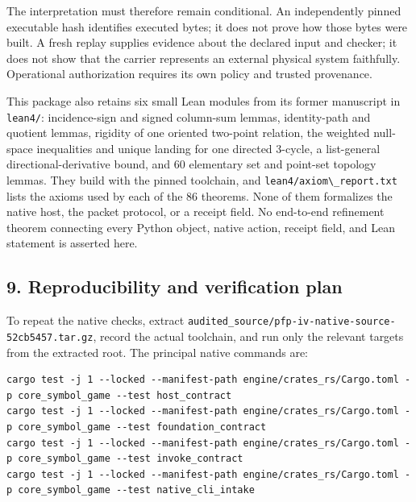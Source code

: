 \documentclass[
  11pt,
]{article}
\newcommand{\passthrough}[1]{#1}
\begin{document}
The interpretation must therefore remain conditional. An independently
pinned executable hash identifies executed bytes; it does not prove how
those bytes were built. A fresh replay supplies evidence about the
declared input and checker; it does not show that the carrier represents
an external physical system faithfully. Operational authorization
requires its own policy and trusted provenance.

This package also retains six small Lean modules from its former
manuscript in \passthrough{\lstinline!lean4/!}: incidence-sign and
signed column-sum lemmas, identity-path and quotient lemmas, rigidity of
one oriented two-point relation, the weighted null-space inequalities
and unique landing for one directed 3-cycle, a list-general
directional-derivative bound, and 60 elementary set and point-set
topology lemmas. They build with the pinned toolchain, and
\passthrough{\lstinline!lean4/axiom\_report.txt!} lists the axioms used
by each of the 86 theorems. None of them formalizes the native host, the
packet protocol, or a receipt field. No end-to-end refinement theorem
connecting every Python object, native action, receipt field, and Lean
statement is asserted here.

\subsection{9. Reproducibility and verification
plan}\label{reproducibility-and-verification-plan}

To repeat the native checks, extract
\nolinkurl{audited_source/pfp-iv-native-source-52cb5457.tar.gz}, record the
actual toolchain, and run only the relevant targets from the extracted
root. The principal native commands are:

\begin{lstlisting}
cargo test -j 1 --locked --manifest-path engine/crates_rs/Cargo.toml -p core_symbol_game --test host_contract
cargo test -j 1 --locked --manifest-path engine/crates_rs/Cargo.toml -p core_symbol_game --test foundation_contract
cargo test -j 1 --locked --manifest-path engine/crates_rs/Cargo.toml -p core_symbol_game --test invoke_contract
cargo test -j 1 --locked --manifest-path engine/crates_rs/Cargo.toml -p core_symbol_game --test native_cli_intake
\end{lstlisting}
\end{document}
